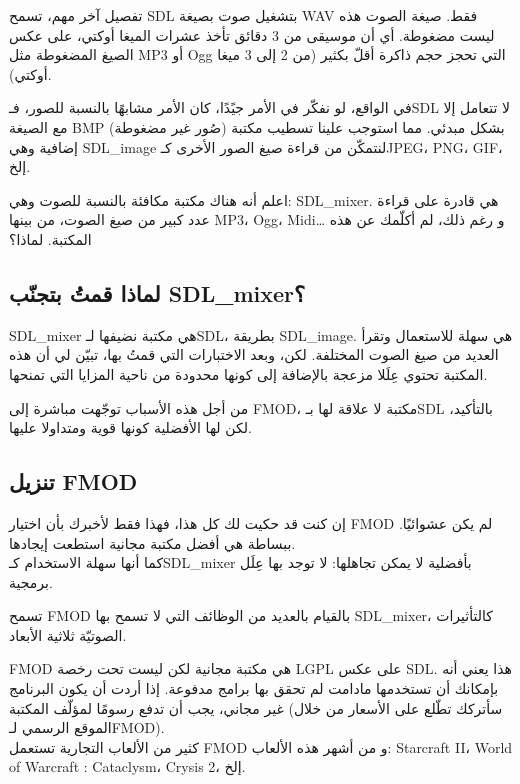 تفصيل آخر مهم، تسمح \textenglish{SDL}
بتشغيل صوت بصيغة
\textenglish{WAV}
فقط. صيغة الصوت هذه ليست مضغوطة. أي أن موسيقى من 3 دقائق تأخذ عشرات الميغا أوكتي،
على عكس الصيغ المضغوطة مثل
\textenglish{MP3}
أو
\textenglish{Ogg}
التي تحجز حجم ذاكرة أقلّ بكثير (من 2 إلى 3 ميغا أوكتي).

في الواقع، لو نفكّر في الأمر جيًدًا، كان الأمر مشابهًا بالنسبة للصور، فـ\textenglish{SDL}
لا تتعامل إلا مع الصيغة
\textenglish{BMP}
(صُور غير مضغوطة) بشكل مبدئي. مما استوجب علينا تسطيب مكتبة إضافية وهي
\textenglish{SDL\_image}
لنتمكّن من قراءة صيغ الصور الأخرى كـ\textenglish{JPEG}، \textenglish{PNG}، \textenglish{GIF}،
إلخ.

اعلم أنه هناك مكتبة مكافئة بالنسبة للصوت وهي:
\textenglish{SDL\_mixer}.
هي قادرة على قراءة عدد كبير من صيغ الصوت، من بينها
\textenglish{MP3}، \textenglish{Ogg}، \textenglish{Midi}\dots
و رغم ذلك، لم أكلّمك عن هذه المكتبة. لماذا؟

\subsection{لماذا قمتُ بتجنّب \textenglish{SDL\_mixer}؟}

\textenglish{SDL\_mixer}
هي مكتبة نضيفها لـ\textenglish{SDL}،
بطريقة 
\textenglish{SDL\_image}.
هي سهلة للاستعمال وتقرأ العديد من صيغ الصوت المختلفة. لكن، وبعد الاختبارات التي قمتُ بها، تبيّن لي أن هذه المكتبة تحتوي عِلَلا مزعجة بالإضافة إلى كونها محدودة من ناحية المزايا التي تمنحها.

من أجل هذه الأسباب توجّهت مباشرة إلى
\textenglish{FMOD}،
مكتبة لا علاقة لها بـ\textenglish{SDL}
بالتأكيد، لكن لها الأفضلية كونها قوية ومتداولا عليها.

\subsection{تنزيل \textenglish{FMOD}}

إن كنت قد حكيت لك كل هذا، فهذا فقط لأخبرك بأن اختيار
\textenglish{FMOD}
لم يكن عشوائيًا. ببساطة هي أفضل مكتبة مجانية استطعت إيجادها.\\
كما أنها سهلة الاستخدام كـ\textenglish{SDL\_mixer}
بأفضلية لا يمكن تجاهلها: لا توجد بها عِلَل برمجية.

تسمح
\textenglish{FMOD}
بالقيام بالعديد من الوظائف التي لا تسمح بها
\textenglish{SDL\_mixer}،
كالتأثيرات الصوتيّة ثلاثية الأبعاد.

\begin{warning}
\textenglish{FMOD}
هي مكتبة مجانية لكن ليست تحت رخصة
\textenglish{LGPL}
على عكس \textenglish{SDL}.
هذا يعني أنه بإمكانك أن تستخدمها مادامت لم تحقق بها برامج مدفوعة. إذا أردت أن يكون البرنامج غير مجاني، يجب أن تدفع رسومًا لمؤلّف المكتبة (سأتركك تطّلع على الأسعار من خلال الموقع الرسمي لـ\textenglish{FMOD}).\\
كثير من الألعاب التجارية تستعمل
\textenglish{FMOD}
و من أشهر هذه الألعاب:
\textenglish{Starcraft II}، \textenglish{World of Warcraft : Cataclysm}، \textenglish{Crysis 2}،
إلخ.
\end{warning}

